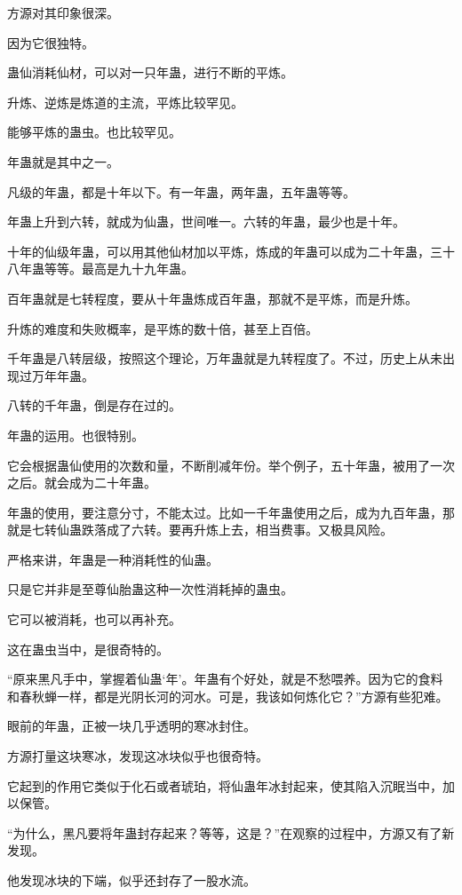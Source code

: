 \begin{this_body}
方源对其印象很深。

因为它很独特。

蛊仙消耗仙材，可以对一只年蛊，进行不断的平炼。

升炼、逆炼是炼道的主流，平炼比较罕见。

能够平炼的蛊虫。也比较罕见。

年蛊就是其中之一。

凡级的年蛊，都是十年以下。有一年蛊，两年蛊，五年蛊等等。

年蛊上升到六转，就成为仙蛊，世间唯一。六转的年蛊，最少也是十年。

十年的仙级年蛊，可以用其他仙材加以平炼，炼成的年蛊可以成为二十年蛊，三十八年蛊等等。最高是九十九年蛊。

百年蛊就是七转程度，要从十年蛊炼成百年蛊，那就不是平炼，而是升炼。

升炼的难度和失败概率，是平炼的数十倍，甚至上百倍。

千年蛊是八转层级，按照这个理论，万年蛊就是九转程度了。不过，历史上从未出现过万年年蛊。

八转的千年蛊，倒是存在过的。

年蛊的运用。也很特别。

它会根据蛊仙使用的次数和量，不断削减年份。举个例子，五十年蛊，被用了一次之后。就会成为二十年蛊。

年蛊的使用，要注意分寸，不能太过。比如一千年蛊使用之后，成为九百年蛊，那就是七转仙蛊跌落成了六转。要再升炼上去，相当费事。又极具风险。

严格来讲，年蛊是一种消耗性的仙蛊。

只是它并非是至尊仙胎蛊这种一次性消耗掉的蛊虫。

它可以被消耗，也可以再补充。

这在蛊虫当中，是很奇特的。

“原来黑凡手中，掌握着仙蛊‘年’。年蛊有个好处，就是不愁喂养。因为它的食料和春秋蝉一样，都是光阴长河的河水。可是，我该如何炼化它？”方源有些犯难。

眼前的年蛊，正被一块几乎透明的寒冰封住。

方源打量这块寒冰，发现这冰块似乎也很奇特。

它起到的作用它类似于化石或者琥珀，将仙蛊年冰封起来，使其陷入沉眠当中，加以保管。

“为什么，黑凡要将年蛊封存起来？等等，这是？”在观察的过程中，方源又有了新发现。

他发现冰块的下端，似乎还封存了一股水流。


\end{this_body}

